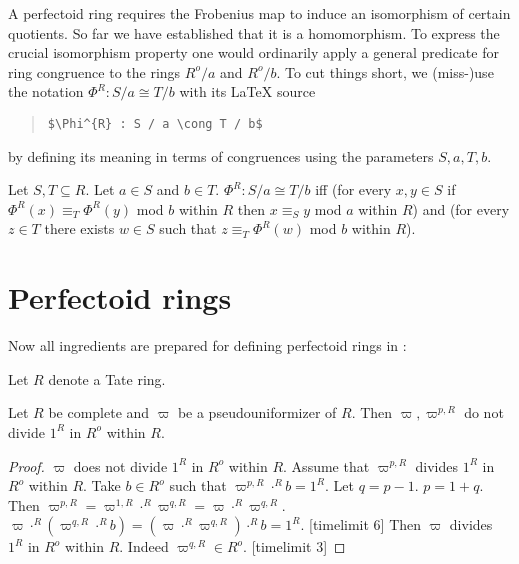 \documentclass[english,11pt]{article}
\begin{document}
A perfectoid ring requires the Frobenius map to induce an isomorphism
of certain quotients.
So far we have established that it is a homomorphism.
To express the crucial isomorphism  property one would ordinarily 
apply a general predicate for ring congruence to the rings
$R^o/a$ and $R^o/b$. To cut things short, we (miss-)use the notation
$\Phi^{R} : S / a \cong T / b$ with 
its \LaTeX{} source 
\begin{quotation}
\verb|$\Phi^{R} : S / a \cong T / b$|
\end{quotation}
by defining its meaning in terms of congruences using the 
parameters $S,a,T,b$.
\begin{forthel}

\begin{definition} Let $S,T \subseteq R$. Let $a \in S$ and $b \in T$. 
$\Phi^{R} : S / a \cong T / b$
iff
(for every $x,y \in S$ if 
$\Phi^{R}(x) \equiv_{T} \Phi^{R}(y)$ mod $b$ within $R$ 
then $x \equiv_{S} y$ mod $a$ within $R$)
and
(for every $z \in T$ there exists $w \in S$ such that 
$z \equiv_{T} \Phi^{R}(w)$ mod $b$ within $R$).
\end{definition}

\end{forthel}

\section{Perfectoid rings}

Now all ingredients are prepared for defining
perfectoid rings in \Naproche{}:

\begin{forthel}


Let $R$ denote a Tate ring.

\begin{lemma}
Let $R$ be complete and $\varpi$ be a pseudouniformizer of $R$.
Then $\varpi, \varpi^{p,R}$ do not divide $1^{R}$ in $R^o$ within $R$.
\end{lemma}
\begin{proof}
$\varpi$ does not divide $1^{R}$ in $R^o$ within $R$.
Assume that $\varpi^{p,R}$ divides $1^{R}$ in $R^o$ within $R$.
Take $b \in R^o$ such that $\varpi^{p,R} \cdot^{R} b = 1^{R}$.
Let $q = p -1$. $p = 1 + q$. Then  $\varpi^{p,R} = 
\varpi^{1,R} \cdot^{R} \varpi^{q,R} = \varpi \cdot^{R} \varpi^{q,R}$.
$ \varpi \cdot^{R} (\varpi^{q,R} \cdot^{R} b) =
(\varpi \cdot^{R} \varpi^{q,R}) \cdot^{R} b =
1^{R}$.
[timelimit 6] 
Then $\varpi$ divides $1^{R}$ in $R^o$ within $R$. Indeed 
$\varpi^{q,R} \in R^o$.
[timelimit 3]
\end{proof}
\end{forthel}
\end{document}
